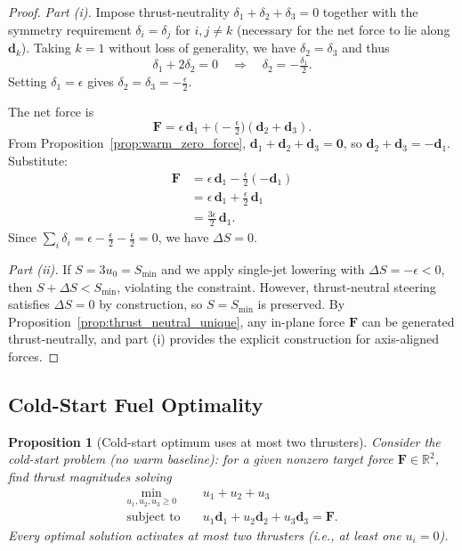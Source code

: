 \documentclass{article}
\newtheorem{proposition}{Proposition}
\begin{document}
\begin{proof}
\emph{Part (i).}
Impose thrust-neutrality $\delta_1 + \delta_2 + \delta_3 = 0$ together with the symmetry 
requirement $\delta_i = \delta_j$ for $i, j \neq k$ (necessary for the net force to lie 
along $\mathbf d_k$). Taking $k = 1$ without loss of generality, we have $\delta_2 = \delta_3$ 
and thus
\[
\delta_1 + 2\delta_2 = 0 \quad\Longrightarrow\quad \delta_2 = -\tfrac{\delta_1}{2}.
\]
Setting $\delta_1 = \epsilon$ gives $\delta_2 = \delta_3 = -\tfrac{\epsilon}{2}$.

The net force is
\[
\mathbf F = \epsilon\,\mathbf d_1 + \bigl(-\tfrac{\epsilon}{2}\bigr)(\mathbf d_2 + \mathbf d_3).
\]
From Proposition~\ref{prop:warm_zero_force}, $\mathbf d_1 + \mathbf d_2 + \mathbf d_3 = \mathbf 0$, 
so $\mathbf d_2 + \mathbf d_3 = -\mathbf d_1$. Substitute:
\[
\begin{aligned}
\mathbf F &= \epsilon\,\mathbf d_1 - \tfrac{\epsilon}{2}(-\mathbf d_1) \\
          &= \epsilon\,\mathbf d_1 + \tfrac{\epsilon}{2}\,\mathbf d_1 \\
          &= \tfrac{3\epsilon}{2}\,\mathbf d_1.
\end{aligned}
\]
Since $\sum_i \delta_i = \epsilon - \tfrac{\epsilon}{2} - \tfrac{\epsilon}{2} = 0$, we have 
$\Delta S = 0$.

\emph{Part (ii).}
If $S = 3u_0 = S_{\min}$ and we apply single-jet lowering with $\Delta S = -\epsilon < 0$, 
then $S + \Delta S < S_{\min}$, violating the constraint. However, thrust-neutral steering 
satisfies $\Delta S = 0$ by construction, so $S = S_{\min}$ is preserved. By 
Proposition~\ref{prop:thrust_neutral_unique}, any in-plane force $\mathbf F$ can be generated 
thrust-neutrally, and part (i) provides the explicit construction for axis-aligned forces.
\end{proof}


\subsection{Cold-Start Fuel Optimality}

\begin{proposition}[Cold-start optimum uses at most two thrusters]
\label{prop:cold_start_two_thrusters}
Consider the cold-start problem (no warm baseline): for a given nonzero target force 
$\mathbf F \in \mathbb{R}^2$, find thrust magnitudes solving
\begin{equation}
\begin{aligned}
\min_{u_1, u_2, u_3 \ge 0} \quad & u_1 + u_2 + u_3 \\
\text{subject to} \quad & u_1 \mathbf d_1 + u_2 \mathbf d_2 + u_3 \mathbf d_3 = \mathbf F.
\end{aligned}
\label{eq:cold_start_LP}
\end{equation}
Every optimal solution activates at most two thrusters (i.e., at least one $u_i = 0$).
\end{proposition}
\end{document}
